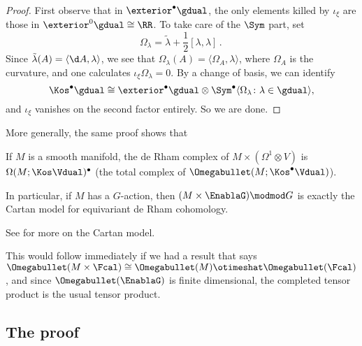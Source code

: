 \begin{proof}
  First observe that in $\exterior^\bullet\gdual$, the only elements killed by $\iota_\xi$ are those in $\exterior^0\gdual \cong \RR $. To take care of the $\Sym$ part, set
  \begin{equation*}
    \Omega_\lambda = \tilde{\lambda} + \frac{1}{2}[\lambda, \lambda]\period
  \end{equation*}
  Since $\tilde{\lambda}(A) = \langle \d A, \lambda\rangle$, we see that $\Omega_\lambda(A) = \langle \Omega_A, \lambda\rangle$, where $\Omega_A$ is the curvature, and one calculates $\iota_\xi \Omega_\lambda = 0$. By a change of basis, we can identify
  \begin{equation*}
    \Kos^\bullet\gdual \cong \exterior^\bullet\gdual \otimes \Sym^\bullet \langle \Omega_\lambda\colon \lambda \in\gdual\rangle,
  \end{equation*}
  and $\iota_\xi$ vanishes on the second factor entirely. So we are done.
\end{proof}

More generally, the same proof shows that
\begin{theorem}
  If $M$ is a smooth manifold, the de Rham complex of $M \times (\Omega^1 \otimes V)$ is $\Omega(M; \Kos \Vdual)^\bullet$ (the total complex of $\Omegabullet(M; \Kos^\bullet \Vdual)$). 
  
 In particular, if $M$ has a $G$-action, then $(M \times \EnablaG )\modmod G$ is exactly the Cartan model for equivariant de Rham cohomology.  
\end{theorem}
\noindent See  for more on the Cartan model. 

This would follow immediately if we had a result that says $\Omegabullet(M \times \Fcal) \cong \Omegabullet(M) \otimeshat \Omegabullet (\Fcal)$, and since $\Omegabullet(\EnablaG)$ is finite dimensional, the completed tensor product is the usual tensor product.


\subsection{The proof}\label{section:proof}

